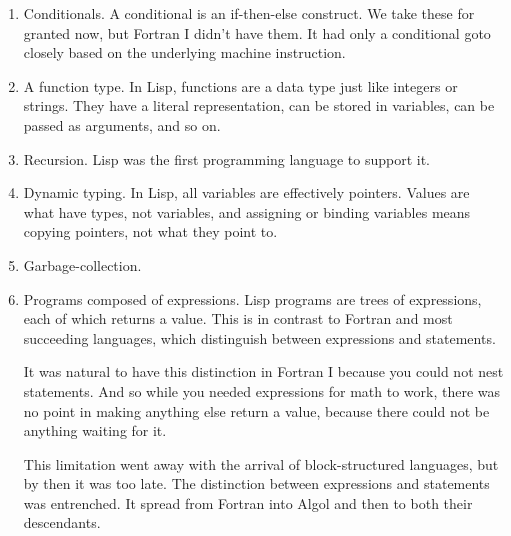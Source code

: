                   \begin{enumerate}
\item 
                      Conditionals. A conditional is an if-then-else construct.
                      We take these for granted now, but Fortran I didn't have
                      them. It had only a conditional goto closely based on the
                      underlying machine instruction.


                    
\item 
                      A function type. In Lisp, functions are a data type just
                      like integers or strings. They have a literal
                      representation, can be stored in variables, can be passed
                      as arguments, and so on.


                    
\item 
                      Recursion. Lisp was the first programming language to
                      support it.


                    
\item 
                      Dynamic typing. In Lisp, all variables are effectively
                      pointers. Values are what have types, not variables, and
                      assigning or binding variables means copying pointers, not
                      what they point to.


                    
\item Garbage-collection.


\item 
                      Programs composed of expressions. Lisp programs are trees
                      of expressions, each of which returns a value. This is in
                      contrast to Fortran and most succeeding languages, which
                      distinguish between expressions and statements.

It
                      was natural to have this distinction in Fortran I because
                      you could not nest statements. And so while you needed
                      expressions for math to work, there was no point in making
                      anything else return a value, because there could not be
                      anything waiting for it.

This limitation went
                      away with the arrival of block-structured languages, but
                      by then it was too late. The distinction between
                      expressions and statements was entrenched. It spread from
                      Fortran into Algol and then to both their descendants.



\end{enumerate}
